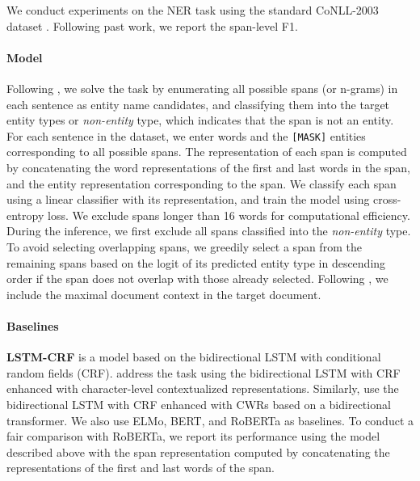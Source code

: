 \documentclass[11pt,a4paper]{article}
\begin{document}
We conduct experiments on the NER task using the standard CoNLL-2003 dataset \cite{TjongKimSang-DeMeulder:2003:CONLL}.
Following past work, we report the span-level F1.

\paragraph{Model}

Following , we solve the task by enumerating all possible spans (or n-grams) in each sentence as entity name candidates, and classifying them into the target entity types or \textit{non-entity} type, which indicates that the span is not an entity.
For each sentence in the dataset, we enter words and the \texttt{[MASK]} entities corresponding to all possible spans.
The representation of each span is computed by concatenating the word representations of the first and last words in the span, and the entity representation corresponding to the span.
We classify each span using a linear classifier with its representation, and train the model using cross-entropy loss.
We exclude spans longer than 16 words for computational efficiency.
During the inference, we first exclude all spans classified into the \textit{non-entity} type.
To avoid selecting overlapping spans, we greedily select a span from the remaining spans based on the logit of its predicted entity type in descending order if the span does not overlap with those already selected.
Following , we include the maximal document context in the target document.

\paragraph{Baselines}

\textbf{LSTM-CRF} \cite{Lample2016NeuralRecognition} is a model based on the bidirectional LSTM with conditional random fields (CRF).
\textbf{} address the task using the bidirectional LSTM with CRF enhanced with character-level contextualized representations.
Similarly, \textbf{} use the bidirectional LSTM with CRF enhanced with CWRs based on a bidirectional transformer.
We also use ELMo, BERT, and RoBERTa as baselines.
To conduct a fair comparison with RoBERTa, we report its performance using the model described above with the span representation computed by concatenating the representations of the first and last words of the span.
\end{document}
